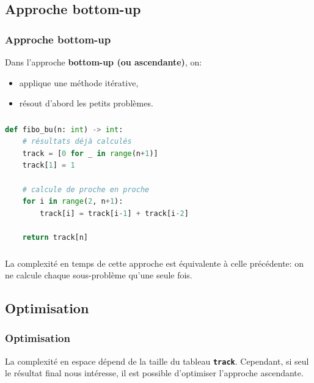 \documentclass[svgnames,11pt]{beamer}
\begin{document}
\subsection{Approche bottom-up}
\begin{frame}
    \frametitle{Approche bottom-up}

    
    \begin{aretenir}[]
    Dans l'approche \textbf{bottom-up (ou ascendante)}, on:
    \begin{itemize}
        \item applique une méthode itérative,
        \item résout d'abord les petits problèmes.
    \end{itemize}
    \end{aretenir}

\end{frame}

\begin{frame}[fragile]
    \frametitle{}

\begin{center}
\begin{lstlisting}[language=Python , basicstyle=\ttfamily\small, xleftmargin=0.2em, xrightmargin=0em]
def fibo_bu(n: int) -> int:
    # résultats déjà calculés
    track = [0 for _ in range(n+1)]
    track[1] = 1

    # calcule de proche en proche
    for i in range(2, n+1):
        track[i] = track[i-1] + track[i-2]

    return track[n]
\end{lstlisting}
\label{CODE}
\end{center}

\end{frame}
\begin{frame}
    \frametitle{}

    \begin{aretenir}[]
    La complexité en temps de cette approche est équivalente à celle précédente: on ne calcule chaque sous-problème qu'une seule fois.
    \end{aretenir}

\end{frame}
\subsection{Optimisation}
\begin{frame}
    \frametitle{Optimisation}
\begin{aretenir}[Remarque]
La complexité en espace dépend de la taille du tableau \textbf{\texttt{track}}. Cependant, si seul le résultat final nous intéresse, il est possible d'optimiser l'approche ascendante.
\end{aretenir}

\end{frame}
\end{document}
